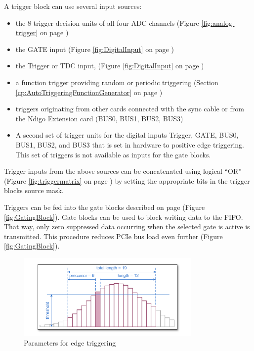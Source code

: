 		A trigger block can use several input sources:

		\begin{itemize}
			\item the 8 trigger decision units of all four ADC channels (Figure \ref{fig:analog-trigger} on page \pageref{fig:analog-trigger})
			\item the GATE input (Figure \ref{fig:DigitalInput} on page \pageref{fig:DigitalInput})
			\item the Trigger or TDC input,  (Figure \ref{fig:DigitalInput} on page \pageref{fig:DigitalInput})
			\item a function trigger providing random or periodic triggering (Section \ref{cp:AutoTriggeringFunctionGenerator} on page \pageref{cp:AutoTriggeringFunctionGenerator})
			\item triggers originating from other cards connected with the sync cable or from the Ndigo Extension card (BUS0, BUS1, BUS2, BUS3)
			\item A second set of trigger units for the digital inputs Trigger, GATE, BUS0, BUS1, BUS2, and BUS3 that is set in hardware to positive edge triggering. This set of triggers is not available as inputs for the gate blocks.
		\end{itemize}

		Trigger inputs from the above sources can be concatenated using logical ``OR'' (Figure \ref{fig:triggermatrix} on page \pageref{fig:triggermatrix}) by setting the appropriate bits in the trigger blocks source mask.\par
		
Triggers can be fed into the gate blocks described on page \pageref{fig:GatingBlock} (Figure \ref{fig:GatingBlock}). Gate blocks can be used to block writing data to the FIFO. That way, only zero suppressed data occurring when the selected gate is active is transmitted. This procedure reduces PCIe bus load even further (Figure \ref{fig:GatingBlock}).

		\begin{figure}[ht]
			\begin{center}
				\includegraphics[width=0.8\textwidth]{figures/edge-trigger.pdf}
				\caption{Parameters for edge triggering\label{fig:edge-trigger}}
			\end{center}
		\end{figure}
		
